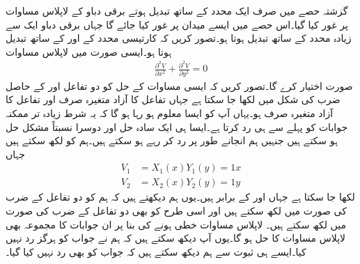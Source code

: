 گزشتہ حصے میں صرف ایک محدد کے ساتھ تبدیل ہوتے برقی دباو کے لاپلاس مساوات پر غور کیا گیا۔اس حصے میں ایسے میدان پر غور کیا جائے گا جہاں برقی دباو ایک سے زیادہ محدد کے ساتھ تبدیل ہوتا ہو۔تصور کریں کہ  کارتیسی محدد کے  اور  کے ساتھ تبدیل ہوتا ہو۔ایسی صورت میں لاپلاس مساوات
\begin{align}\label{مساوات_لاپلاس_ضربی_حل_الف}
\frac{\partial^2 V}{\partial x^2}+\frac{\partial^2 V}{\partial y^2}=0
\end{align}
صورت اختیار کرے گا۔تصور کریں کہ ایسی مساوات کے حل کو دو  تفاعل  اور  کے حاصل ضرب  کی شکل میں لکھا جا سکتا ہے جہاں  تفاعل کا آزاد متغیرہ صرف  اور  تفاعل کا آزاد متغیرہ صرف  ہو۔یہاں آپ کو ایسا معلوم ہو رہا ہو گا کہ یہ شرط زیادہ تر ممکنہ جوابات کو پہلے سے ہی رد کرتا ہے۔ایسا ہی ایک سادہ حل  اور دوسرا نسبتاً مشکل حل   ہو سکتے ہیں جنہیں ہم انجانے طور پر رد کر رہے ہو سکتے ہیں۔ہم  کو  لکھ سکتے ہیں جہاں
\begin{align*}
V_1&=X_1(x) Y_1(y)=1x\\
V_2&=X_2(x) Y_2(y)=1y
\end{align*}
لکھا جا سکتا ہے جہاں  اور  کے برابر ہیں۔یوں ہم دیکھتے ہیں کہ ہم   کو دو تفاعل کے ضرب کی صورت میں لکھ سکتے ہیں اور اسی طرح  کو بھی دو تفاعل کے ضرب کی صورت میں لکھ سکتے ہیں۔ لاپلاس مساوات خطی ہونے کی بنا پر ان جوابات کا مجموعہ  بھی لاپلاس مساوات کا حل ہو گا۔یوں آپ دیکھ سکتے ہیں کہ ہم نے  جواب کو ہرگز رد نہیں کیا۔ایسے ہی ثبوت سے ہم دیکھ سکتے ہیں کہ   جواب کو بھی رد نہیں کیا گیا۔

